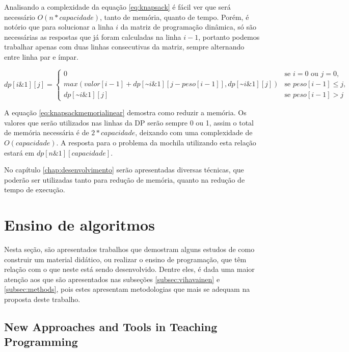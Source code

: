 Analisando a complexidade da equação \ref{eq:knapsack} é fácil ver que será necessário $O(n*capacidade)$, tanto de memória, quanto de tempo. Porém, é notório que para solucionar a linha $i$ da matriz de programação dinâmica, só são necessárias as respostas que já foram calculadas na linha $i - 1$, portanto podemos trabalhar apenas com duas linhas consecutivas da matriz, sempre alternando entre linha par e ímpar. 

\begin{equation}
dp[i\&1][j] = 
\begin{cases}
0 &\text{se } i = 0 \text{ ou } j = 0,\\

max(valor[i-1] + dp[\text{\textasciitilde}i\&1][j-peso[i-1]], dp[\text{\textasciitilde}i\&1][j]) &\text{se } peso[i-1] \leq{j},\\
dp[\text{\textasciitilde}i\&1][j] &\text{se } peso[i-1] > j
\end{cases}
\label{eq:knapsackmemorialinear}
\end{equation}

A equação \ref{eq:knapsackmemorialinear} demostra como reduzir a memória. Os valores que serão utilizados nas linhas da DP serão sempre 0 ou 1, assim o total de memória necessária é de $2*capacidade$, deixando com uma complexidade de $O(capacidade)$. A resposta para o problema da mochila utilizando esta relação estará em $dp[n\&1][capacidade]$.

No capítulo \ref{chap:desenvolvimento} serão apresentadas diversas técnicas, que poderão ser utilizadas tanto para redução de memória, quanto na redução de tempo de execução.

\section{Ensino de algoritmos}
\label{sec:ensino}

Nesta seção, são apresentados trabalhos que demostram alguns estudos de como construir um material didático, ou realizar o ensino de programação, que têm relação com o que neste está sendo desenvolvido. Dentre eles, é dada uma maior atenção aos que são apresentados nas subseções \ref{subsec:vihavainen} e \ref{subsec:methods}, pois estes apresentam metodologias que mais se adequam na proposta deste trabalho. 


\subsection{New Approaches and Tools in Teaching Programming} \nocite{newapproach}

